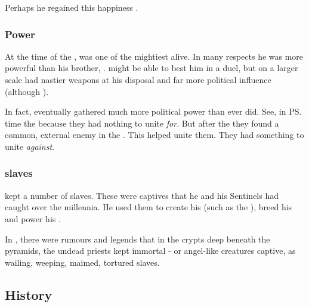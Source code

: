 Perhaps he regained this happiness . 





\subsubsection{Power}
At the time of the , \Secherdamon{} was one of the mightiest \dragons{} alive. 
In many respects he was more powerful than his brother, \Ishnaruchaefir. 
\Ishnaruchaefir{} might be able to best him in a duel, but on a larger scale \Secherdamon{} had nastier weapons at his disposal and far more political influence (although ). 

In fact, \Secherdamon{} eventually gathered much more political power than \Nexagglachel{} ever did. 
See, in \ps{\Nexagglachel} time the  because they had nothing to unite \emph{for}. 
But after the \secondbanewar{} they found a common, external enemy in the \resphain.
This helped \Secherdamon{} unite them. 
They had something to unite \emph{against}. 





\subsubsection{\Resphan slaves}
\Secherdamon kept a number of \resphan slaves. 
These were captives that he and his Sentinels had caught over the millennia. 
He used them to create his  (such as the ), breed his  and power his .

In \Durcac, there were rumours and legends that in the crypts deep beneath the pyramids, the undead priests kept immortal \human- or angel-like creatures captive, as wailing, weeping, maimed, tortured slaves. 









\subsection{History}





